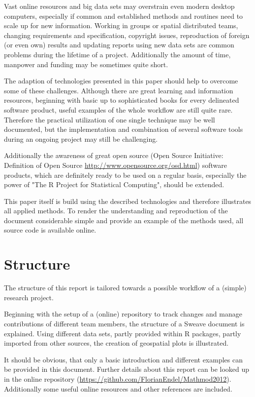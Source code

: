 \documentclass{ifacconf}
\begin{document}
Vast online resources and big data sets may overstrain
even modern desktop computers, especially if common and established methods
and routines need to scale up for new information. 
Working in groups or spatial distributed teams,  
changing requirements and specification, copyright issues, reproduction of 
foreign (or even own) results  and updating reports using new data sets are common 
problems during the lifetime of a project. 
Additionally the amount of time, manpower and funding 
may be sometimes quite short.

The adaption of technologies presented in this paper should help to overcome
some of these challenges. Although there are great learning and information resources, 
beginning with 
basic up to sophisticated books for every delineated software product,
useful examples of the whole workflow are still quite rare. Therefore the 
practical utilization of one single technique may be well documented, but
the implementation and combination of several software tools during an ongoing
project may still be challenging.

Additionally the awareness of great open source
(Open Source Initiative: Definition of Open Source \url{http://www.opensource.org/osd.html}) 
software products, which are 
definitely ready to be used on a regular basis, especially the power of "The R Project
for Statistical Computing", should be extended.

This paper itself is build using the described technologies and therefore illustrates 
all applied methods. To render the understanding and reproduction of the document 
considerable simple and provide an example of the methods used, all source code is
available online.

\section{Structure}
The structure of this report is tailored towards a possible workflow of a (simple)
research project. 

Beginning with the setup of a (online) repository to track changes and manage 
contributions of different team members, the structure of a Sweave document is
explained. Using different data sets, partly provided within R packages, partly
imported from other sources, the creation of geospatial plots is illustrated. 

It should be obvious, that only a basic introduction and different examples 
can be provided in this document. Further details about this report can be
looked up in the online repository (\url{https://github.com/FlorianEndel/Mathmod2012}). 
Additionally some useful online resources and other references are included.
\end{document}

